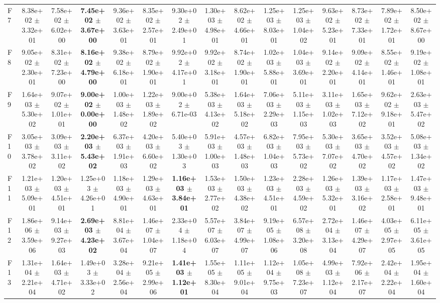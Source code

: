 \begin{table}
{\begin{tabular}{lcccccccccccccc}
F7 & 8.38e+02 $\pm$ 3.32e+01 & 7.58e+02 $\pm$ 6.02e+00 & \textbf{7.45e+02 $\pm$ 3.67e+00} & 9.36e+02 $\pm$ 3.63e+01 & 8.35e+02 $\pm$ 2.57e+01 & 9.30e+02 $\pm$ 2.49e+01 & 1.30e+03 $\pm$ 4.98e+01 & 8.62e+02 $\pm$ 4.66e+01 & 1.25e+03 $\pm$ 8.03e+01 & 1.25e+03 $\pm$ 1.04e+02 & 9.63e+02 $\pm$ 5.23e+01 & 8.73e+02 $\pm$ 7.33e+01 & 7.89e+02 $\pm$ 1.72e+01 & 8.50e+02 $\pm$ 8.67e+00 \\
F8 & 9.05e+02 $\pm$ 2.30e+01 & 8.31e+02 $\pm$ 7.23e+00 & \textbf{8.16e+02 $\pm$ 4.79e+00} & 9.38e+02 $\pm$ 6.18e+01 & 8.79e+02 $\pm$ 1.90e+01 & 9.92e+02 $\pm$ 4.17e+01 & 9.92e+02 $\pm$ 3.18e+01 & 8.74e+02 $\pm$ 1.90e+01 & 1.02e+03 $\pm$ 5.88e+01 & 1.04e+03 $\pm$ 3.69e+01 & 9.14e+02 $\pm$ 2.20e+01 & 9.09e+02 $\pm$ 4.14e+01 & 8.55e+02 $\pm$ 1.46e+01 & 9.19e+02 $\pm$ 1.08e+01 \\
F9 & 1.64e+03 $\pm$ 5.30e+02 & 9.07e+02 $\pm$ 1.01e+01 & \textbf{9.00e+02 $\pm$ 0.00e+00} & 1.00e+03 $\pm$ 1.48e+02 & 1.22e+03 $\pm$ 1.89e+02 & 9.00e+02 $\pm$ 6.71e-03 & 5.38e+03 $\pm$ 4.13e+02 & 1.64e+03 $\pm$ 5.18e+02 & 7.06e+03 $\pm$ 2.29e+03 & 5.11e+03 $\pm$ 1.15e+03 & 3.11e+03 $\pm$ 1.02e+03 & 1.65e+03 $\pm$ 7.12e+02 & 9.62e+02 $\pm$ 9.18e+01 & 2.63e+03 $\pm$ 5.47e+02 \\
F10 & 3.05e+03 $\pm$ 3.78e+02 & 3.09e+03 $\pm$ 3.11e+02 & \textbf{2.20e+03 $\pm$ 5.43e+02} & 6.37e+03 $\pm$ 1.91e+03 & 4.20e+03 $\pm$ 6.60e+02 & 5.40e+03 $\pm$ 1.30e+03 & 5.91e+03 $\pm$ 1.00e+03 & 4.57e+03 $\pm$ 1.48e+03 & 6.82e+03 $\pm$ 1.04e+03 & 7.95e+03 $\pm$ 5.73e+02 & 5.30e+03 $\pm$ 7.07e+02 & 3.65e+03 $\pm$ 4.70e+02 & 3.52e+03 $\pm$ 4.57e+02 & 5.08e+03 $\pm$ 1.34e+02 \\
F11 & 1.21e+03 $\pm$ 5.09e+01 & 1.20e+03 $\pm$ 4.51e+01 & 1.25e+03 $\pm$ 4.26e+01 & 1.18e+03 $\pm$ 4.90e+01 & 1.29e+03 $\pm$ 4.63e+01 & \textbf{1.16e+03 $\pm$ 3.84e+01} & 1.53e+03 $\pm$ 2.77e+02 & 1.50e+03 $\pm$ 4.38e+02 & 1.23e+03 $\pm$ 4.51e+01 & 2.28e+03 $\pm$ 4.59e+02 & 1.26e+03 $\pm$ 5.32e+01 & 1.39e+03 $\pm$ 3.16e+02 & 1.17e+03 $\pm$ 2.58e+01 & 1.47e+03 $\pm$ 9.48e+01 \\
F12 & 1.86e+06 $\pm$ 3.59e+06 & 9.14e+03 $\pm$ 9.27e+03 & \textbf{2.69e+03 $\pm$ 4.23e+02} & 8.81e+04 $\pm$ 3.67e+04 & 1.46e+07 $\pm$ 1.04e+07 & 2.33e+04 $\pm$ 1.18e+04 & 5.57e+07 $\pm$ 6.03e+07 & 3.84e+07 $\pm$ 4.99e+07 & 9.19e+05 $\pm$ 1.08e+06 & 6.57e+08 $\pm$ 3.20e+08 & 2.72e+04 $\pm$ 3.13e+04 & 1.46e+07 $\pm$ 4.29e+07 & 4.03e+05 $\pm$ 2.97e+05 & 6.11e+05 $\pm$ 3.61e+05 \\
F13 & 1.31e+04 $\pm$ 2.21e+04 & 1.64e+03 $\pm$ 4.71e+02 & 1.49e+03 $\pm$ 3.33e+02 & 3.28e+04 $\pm$ 2.56e+04 & 9.21e+05 $\pm$ 2.99e+06 & \textbf{1.41e+03 $\pm$ 1.12e+01} & 1.55e+05 $\pm$ 8.30e+04 & 1.11e+05 $\pm$ 9.01e+04 & 1.12e+04 $\pm$ 9.75e+03 & 1.05e+08 $\pm$ 7.23e+07 & 4.99e+03 $\pm$ 1.12e+04 & 7.92e+06 $\pm$ 2.17e+07 & 2.42e+04 $\pm$ 2.22e+04 & 1.95e+04 $\pm$ 1.60e+04 \\

\end{tabular}}
\end{table}
